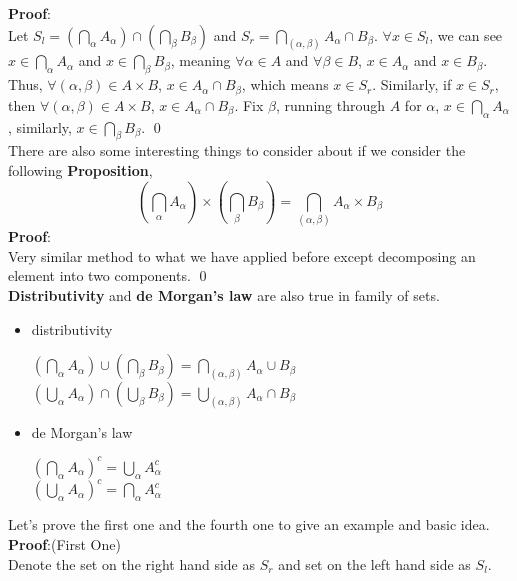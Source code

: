 \documentclass{article}
\begin{document}
\textbf{Proof}:\\Let
$S_{l} = (\bigcap_{\alpha}A_{\alpha}) \cap ( \bigcap_{\beta} B_{\beta})$ and $S_{r} = \bigcap_{(\alpha, \beta)} A_{\alpha} \cap B_{\beta}$. $\forall x \in S_{l}$, we can see $x \in \bigcap_{\alpha}A_{\alpha}$ and $x \in \bigcap_{\beta} B_{\beta}$, meaning
$\forall \alpha \in A$ and $\forall \beta \in B$, $x \in A_{\alpha}$ and $x \in B_{\beta}$. Thus, $\forall (\alpha, \beta) \in A\times B$, $x \in A_{\alpha} \cap B_{\beta}$, which means $x \in S_{r}$. Similarly, if $x \in S_{r}$, then $\forall (\alpha, \beta) \in A \times B$,
$x \in A_{\alpha}\cap B_{\beta}$. Fix $\beta$, running through $A$ for $\alpha$, $x \in \bigcap_{\alpha} A_{\alpha}$, similarly, $x \in \bigcap_{\beta} B_{\beta}$. \qed\\
There are also some interesting things to consider about if we consider the following \textbf{Proposition},
$$
\left(\bigcap_{\alpha}A_{\alpha}\right) \times \left( \bigcap_{\beta} B_{\beta}\right) = \bigcap_{(\alpha, \beta)} A_{\alpha} \times B_{\beta}
$$
\textbf{Proof}:\\
Very similar method to what we have applied before except decomposing an element into two components. \qed\\
\textbf{Distributivity} and \textbf{de Morgan's law} are also true in family of sets.
\begin{itemize}
    \item{distributivity}
    \begin{center}
        $(\bigcap_{\alpha}A_{\alpha}) \cup ( \bigcap_{\beta} B_{\beta}) = \bigcap_{(\alpha, \beta)} A_{\alpha} \cup B_{\beta}$\\
        $ (\bigcup_{\alpha}A_{\alpha}) \cap ( \bigcup_{\beta} B_{\beta}) = \bigcup_{(\alpha, \beta)} A_{\alpha} \cap B_{\beta}$
    \end{center}
    \item{de Morgan's law}
    \begin{center}
                        $(\bigcap_{\alpha}A_{\alpha})^c = \bigcup_{\alpha} A_{\alpha} ^ c$\\
                        $(\bigcup_{\alpha}A_{\alpha})^c = \bigcap_{\alpha} A_{\alpha} ^ c$
    \end{center}
\end{itemize}
Let's prove the first one and the fourth one to give an example and basic idea.\\
\textbf{Proof}:(First One)\\
Denote the set on the right hand side as $S_r$ and set on the left hand side as $S_l$. 
\end{document}
